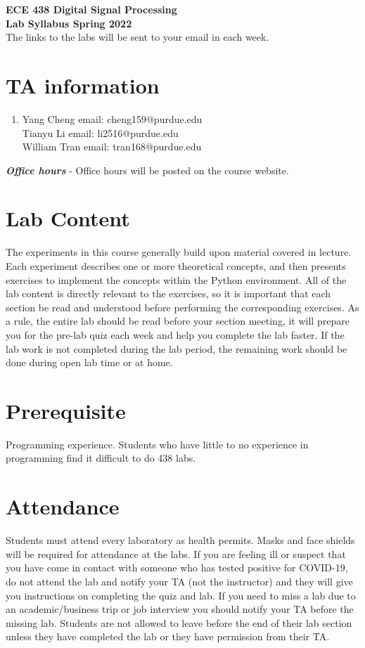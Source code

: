 \documentclass[letterpaper, 11pt]{article}
\newcommand\mytab{\tab \hspace{-2cm}}
\begin{document}
\begin{center}
\huge \textbf{ ECE 438 Digital Signal Processing} \\
 \textbf{Lab Syllabus Spring 2022 }\\
\medskip
\normalsize The links to the labs will be sent to your email in each week.
\end{center}

\section*{TA information}
\begin{enumerate}
\item[] Yang Cheng \mytab email: cheng159@purdue.edu\\
Tianyu Li \mytab email: li2516@purdue.edu\\
William Tran \mytab email: tran168@purdue.edu
\end{enumerate}



\textit{\textbf{Office hours}} - Office hours will be posted on the course website.

\section*{Lab Content}
The experiments in this course generally build upon material covered in lecture. Each experiment describes one or more theoretical concepts, and then presents exercises to implement the concepts within the Python environment. All of the lab content is directly relevant to the exercises, so it is important that each section be read and understood before performing the corresponding exercises. As a rule, the entire lab should be read before your section meeting, it will prepare you for the pre-lab quiz each week and help you complete the lab faster. If the lab work is not completed during the lab period, the remaining work should be done during open lab time or at home.

\section*{Prerequisite}
Programming experience. Students who have little to no experience in programming find it difficult to do 438 labs.

\section*{Attendance}
Students must attend every laboratory as health permits. Masks and face shields will be required for attendance at the labs. If you are feeling ill or suspect that you have come in contact with someone who has tested positive for COVID-19, do not attend the lab and notify your TA (not the instructor) and they will give you instructions on completing the quiz and lab. If you need to miss a lab due to an academic/business trip or job interview you should notify your TA before the missing lab. Students are not allowed to leave before the end of their lab section unless they have completed the lab or they have permission from their TA.
\end{document}
